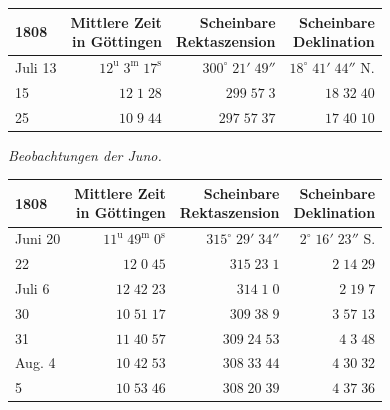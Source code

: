 \begin{center}\fontsize{10}{12}\selectfont\setlength{\tabcolsep}{3pt}\renewcommand{\arraystretch}{1.15}\begin{tabular}{lrrr}
1808 & \shortstack{Mittlere Zeit\\in Göttingen} & \shortstack{Scheinbare\\Rektaszension} & \shortstack{Scheinbare\\Deklination}\\\hline
Juli 13 & $12^{\text{u}}\;3^{\text{m}}\;17^{\text{s}}$ & $300^\circ\;21'\;49''$ & $18^\circ\;41'\;44''$ N.\\
15 & $12\;1\;28$ & $299\;57\;3$ & $18\;32\;40$\\
25 & $10\;9\;44$ & $297\;57\;37$ & $17\;40\;10$\\
\end{tabular}\end{center}


\begin{center}
\emph{Beobachtungen der Juno.}
\end{center}


\begin{center}\fontsize{10}{12}\selectfont\setlength{\tabcolsep}{3pt}\renewcommand{\arraystretch}{1.15}\begin{tabular}{lrrr}
1808 & \shortstack{Mittlere Zeit\\in Göttingen} & \shortstack{Scheinbare\\Rektaszension} & \shortstack{Scheinbare\\Deklination}\\\hline
Juni 20 & $11^{\text{u}}\;49^{\text{m}}\;0^{\text{s}}$ & $315^\circ\;29'\;34''$ & $2^\circ\;16'\;23''$ S.\\
22 & $12\;0\;45$ & $315\;23\;1$ & $2\;14\;29$\\
Juli 6 & $12\;42\;23$ & $314\;1\;0$ & $2\;19\;7$\\
30 & $10\;51\;17$ & $309\;38\;9$ & $3\;57\;13$\\
31 & $11\;40\;57$ & $309\;24\;53$ & $4\;3\;48$\\
Aug. 4 & $10\;42\;53$ & $308\;33\;44$ & $4\;30\;32$\\
5 & $10\;53\;46$ & $308\;20\;39$ & $4\;37\;36$\\
\end{tabular}\end{center}


\par{}

